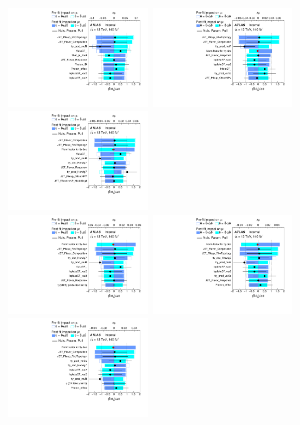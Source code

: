 \begin{figure}[ht]
  \centering
  \includegraphics[width=0.33\textwidth]{figures/diff_xsec/ljet_tty_prod_mu_blinded/Ranking/tty1l_pt_all_syst/Ranking_tty_pt_Bin_001_mu.pdf}%
  \includegraphics[width=0.33\textwidth]{figures/diff_xsec/ljet_tty_prod_mu_blinded/Ranking/tty1l_pt_all_syst/Ranking_tty_pt_Bin_002_mu.pdf}%
  \includegraphics[width=0.33\textwidth]{figures/diff_xsec/ljet_tty_prod_mu_blinded/Ranking/tty1l_pt_all_syst/Ranking_tty_pt_Bin_003_mu.pdf}\\
  \includegraphics[width=0.33\textwidth]{figures/diff_xsec/ljet_tty_prod_mu_blinded/Ranking/tty1l_pt_all_syst/Ranking_tty_pt_Bin_004_mu.pdf}%
  \includegraphics[width=0.33\textwidth]{figures/diff_xsec/ljet_tty_prod_mu_blinded/Ranking/tty1l_pt_all_syst/Ranking_tty_pt_Bin_005_mu.pdf}%
  \includegraphics[width=0.33\textwidth]{figures/diff_xsec/ljet_tty_prod_mu_blinded/Ranking/tty1l_pt_all_syst/Ranking_tty_pt_Bin_006_mu.pdf}\\

\end{figure}
